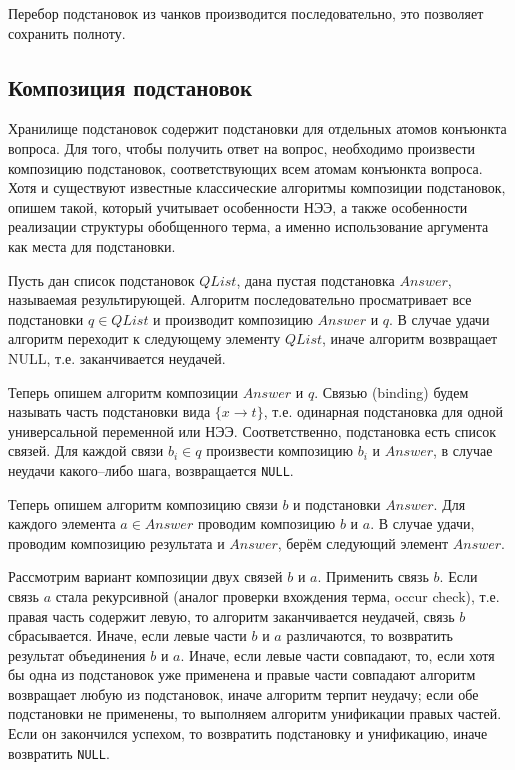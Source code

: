 Перебор подстановок из чанков производится последовательно, это позволяет сохранить полноту.


\subsection{Композиция подстановок}

Хранилище подстановок содержит подстановки для отдельных атомов конъюнкта вопроса. Для того, чтобы получить ответ на вопрос, необходимо произвести композицию подстановок, соответствующих всем атомам конъюнкта вопроса. Хотя и существуют известные классические алгоритмы композиции подстановок, опишем такой, который учитывает особенности НЭЭ, а также особенности реализации структуры обобщенного терма, а именно использование аргумента как места для подстановки.

Пусть дан список подстановок $QList$, дана пустая подстановка $Answer$, называемая результирующей. Алгоритм последовательно просматривает все подстановки $q \in QList$ и производит композицию $Answer$ и $q$. В случае удачи алгоритм переходит к следующему элементу $QList$, иначе алгоритм возвращает NULL, т.е. заканчивается неудачей.

Теперь опишем алгоритм композиции $Answer$ и $q$. Связью (binding) будем называть часть подстановки вида $\{x \rightarrow t\}$, т.е. одинарная подстановка для одной универсальной переменной или НЭЭ. Соответственно, подстановка есть список связей. %
Для каждой связи $b_i \in q$ произвести композицию $b_i$ и $Answer$, в случае неудачи какого--либо шага, возвращается \texttt{NULL}.

Теперь опишем алгоритм композицию связи $b$ и подстановки $Answer$. Для каждого элемента $a \in Answer$ проводим композицию $b$ и $a$. В случае удачи, проводим композицию результата и $Answer$, берём следующий элемент $Answer$.

Рассмотрим вариант композиции двух связей $b$ и $a$. Применить связь $b$. Если связь $a$ стала рекурсивной (аналог проверки вхождения терма, occur check), т.е. правая часть содержит левую, то алгоритм заканчивается неудачей, связь $b$  сбрасывается. Иначе, если левые части $b$ и $a$ различаются, то возвратить результат объединения $b$ и $a$. Иначе, если левые части совпадают, то, если хотя бы одна из подстановок уже применена и правые части совпадают алгоритм возвращает любую из подстановок, иначе алгоритм терпит неудачу; если обе подстановки не применены, то выполняем алгоритм унификации правых частей. Если он закончился успехом, то возвратить подстановку и унификацию, иначе возвратить \texttt{NULL}.



